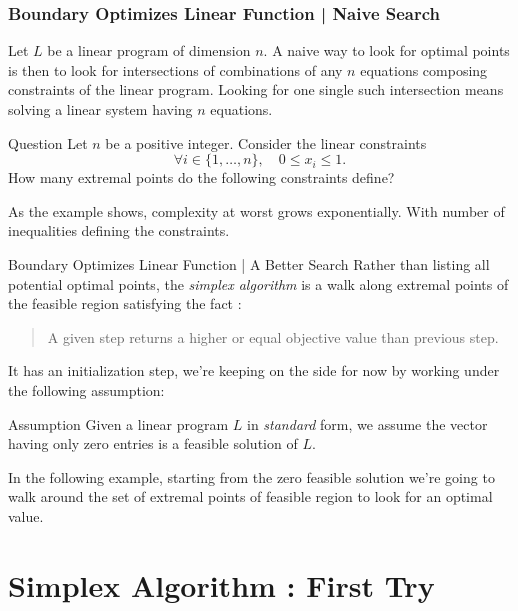 \documentclass[aspectratio = 169]{beamer}
\begin{document}
\begin{frame}
  \frametitle{Boundary Optimizes Linear Function | Naive Search}
  Let $L$ be a linear program of dimension $n$. A naive way to look
  for optimal points is then to look for intersections of combinations
  of any $n$ equations composing constraints of the linear
  program. \pause Looking for one single such intersection means
  solving a linear system having $n$ equations. 
  \pause
  \begin{halfshyblock}{Question}
    Let $n$ be a positive integer. Consider the linear constraints
    \[
    \forall i \in \{1, \ldots, n\}, \quad 0 \leq x_i \leq 1.
    \]
    How many extremal points do the following constraints define?
  \end{halfshyblock}
  \pause 
  As the example shows, complexity at worst grows exponentially. With
  number of inequalities defining the constraints.
\end{frame}

\begin{frame}{Boundary Optimizes Linear Function | A Better Search}
  Rather than listing all potential optimal points, the \emph{simplex
    algorithm} is a walk along extremal points of the feasible region
  satisfying the fact :
  \begin{quotation}
    A given step returns a higher or equal objective value than
    previous step.
  \end{quotation}
  It has an initialization step, we're keeping on the side for
  now by working under the following assumption: 
  \begin{alertblock}{Assumption}
    Given a linear program $L$ in \textit{standard} form, we assume
    the vector having only zero entries is a feasible solution of $L$.
  \end{alertblock}
  \pause 
  In the following example, starting from the zero feasible
  solution we're going to walk around the set of extremal points of
  feasible region to look for an optimal value.
\end{frame}

\section{Simplex Algorithm : First Try}
\end{document}
